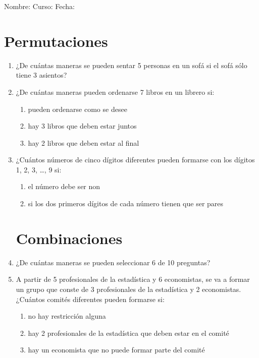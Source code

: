 \documentclass[letterpaper,fleqn]{article}
\newcommand{\LineaNombre}{%
\par
\vspace{\baselineskip}
Nombre:\hrulefill \; Curso: \underline{\hspace*{48pt}} \; Fecha: \underline{\hspace*{2.5cm}} \relax
\par}
\begin{document}
\LineaNombre
\section*{Permutaciones}
\begin{enumerate}
 \item ¿De cuántas maneras se pueden sentar 5 personas en un sofá si el sofá sólo tiene 3 asientos?\noanswer
 \item ¿De cuántas maneras pueden ordenarse 7 libros en un librero si:
 \begin{enumerate}
 \item pueden ordenarse como se desee\noanswer
 \item hay 3 libros que deben estar juntos \noanswer
 \item hay 2 libros que deben estar al final \noanswer
\end{enumerate}   
\item ¿Cuántos números de cinco dígitos diferentes pueden formarse con los dígitos 1, 2, 3, \ldots , 9 si: 
\begin{enumerate}
\item el número debe ser non\noanswer
\newpage
\item si los dos primeros dígitos de cada número tienen que ser pares\noanswer
\end{enumerate} 
\section*{Combinaciones}
\item ¿De cuántas maneras se pueden seleccionar 6 de 10 preguntas?\noanswer
\item A partir de 5 profesionales de la estadística y 6 economistas, se va a formar un grupo que conste de 3 profesionales de la
estadística y 2 economistas. ¿Cuántos comités diferentes pueden formarse si: 
\begin{enumerate}
\item no hay restricción alguna\noanswer
\item hay 2 profesionales de la estadística que deben estar en el comité\noanswer
\item hay un economista que no puede formar parte del comité\noanswer
\end{enumerate}  
 \end{enumerate}
\end{document}
